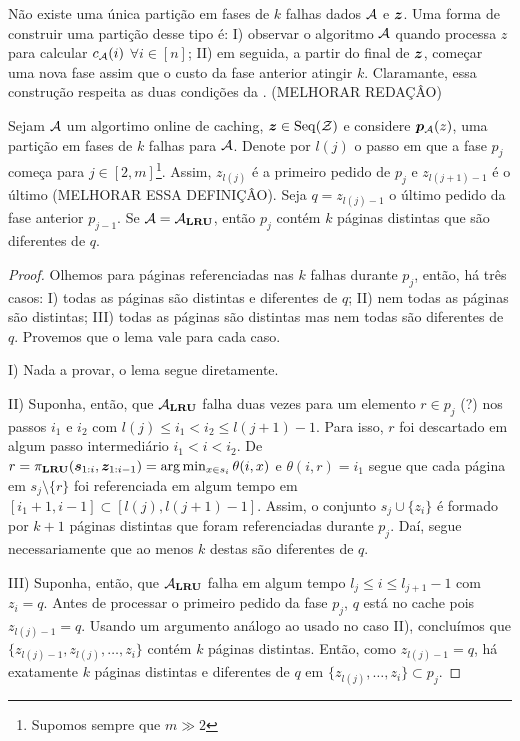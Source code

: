 Não existe uma única partição em fases de \(k\) falhas dados \(\mathcal{A}\) e \(\bm{z}\). Uma forma de construir uma partição desse tipo é: I) observar o algoritmo \(\mathcal{A}\) quando processa \(z\) para calcular \(c_{\mathcal{A}}(i)\) \(\forall i \in [n]\); II) em seguida, a partir do final de \(\bm{z}\), começar uma nova fase assim que o custo da fase anterior atingir \(k\). Claramante, essa construção respeita as duas condições da . (MELHORAR REDAÇÂO)

\begin{lemma}
  \label{lem:k-part}
  Sejam \(\mathcal{A}\) um algortimo online de caching, \(\bm{z} \in \operatorname{Seq}(\mathcal{Z})\) e considere \(\bm{p}_{\mathcal{A}}(z)\), uma partição em fases de \(k\) falhas para \(\mathcal{A}\). Denote por \(l(j)\) o passo em que a fase \(p_j\) começa para \(j \in [2,m]\)\footnote{Supomos sempre que \(m \gg 2\)}. Assim, \(z_{l(j)}\) é a primeiro pedido de \(p_j\) e \(z_{l(j+1)-1}\) é o último (MELHORAR ESSA DEFINIÇÂO). Seja \(q = z_{l(j)-1}\) o último pedido da fase anterior \(p_{j-1}\). Se \(\mathcal{A} = \mathcal{A}_{\mathbf{LRU}}\), então \(p_j\) contém \(k\) páginas distintas que são diferentes de \(q\). 

  \begin{proof} Olhemos para páginas referenciadas nas \(k\) falhas durante \(p_j\), então, há três casos: I) todas as páginas são distintas e diferentes de \(q\); II) nem todas as páginas são distintas; III) todas as páginas são distintas mas nem todas são diferentes de \(q\). Provemos que o lema vale para cada caso.

  I) Nada a provar, o lema segue diretamente.

  II) Suponha, então, que \(\mathcal{A}_{\mathbf{LRU}}\) falha duas vezes para um elemento \(r \in p_j\) (?) nos passos \(i_1\) e \(i_2\) com \(l(j) \le i_1 < i_2 \le l(j+1) - 1\). Para isso, \(r\) foi descartado em algum passo intermediário \(i_1 < i < i_2\). De \(r = \pi_{\mathbf{LRU}}(\bm{s}_{1:i}, \bm{z}_{1:i-1}) = \arg\min_{x \in s_i} \theta(i, x)\) e \(\theta(i, r) = i_1\) segue que cada página em \(s_j \setminus \{r\}\) foi referenciada em algum tempo em \([i_1+1, i-1] \subset [l(j), l(j+1)-1]\). Assim, o conjunto \(s_j \cup \{z_i\}\) é formado por \(k+1\) páginas distintas que foram referenciadas durante \(p_j\). Daí, segue necessariamente que ao menos \(k\) destas são diferentes de \(q\).


  III) Suponha, então, que \(\mathcal{A}_{\mathbf{LRU}}\) falha em algum tempo \(l_j \le i \le l_{j+1}-1\) com \(z_i = q\). Antes de processar o primeiro pedido da fase \(p_j\), \(q\) está no cache pois \(z_{l(j)-1} = q\). Usando um argumento análogo ao usado no caso II), concluímos que \(\{z_{l(j)-1}, z_{l(j)}, \dotsc, z_i\}\) contém \(k\) páginas distintas. Então, como \(z_{l(j)-1} = q\), há exatamente \(k\) páginas distintas e diferentes de \(q\) em \(\{z_{l(j)}, \dotsc, z_i\} \subset p_j\).

\end{proof}
\end{lemma}


